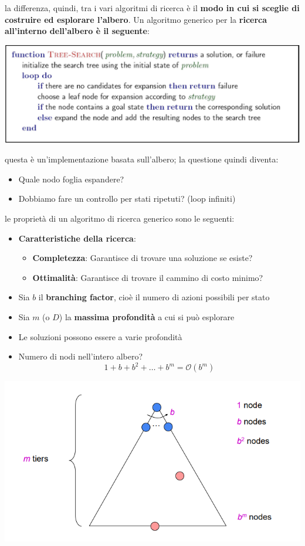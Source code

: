 \documentclass[12pt]{article}
\begin{document}
la differenza, quindi, tra i vari algoritmi di ricerca è il \textbf{modo in cui si sceglie di costruire ed esplorare l'albero}.
Un algoritmo generico per la \textbf{ricerca all'interno dell'albero è il seguente}:
\begin{center}
    \includegraphics[width = 1\linewidth]{Images/25.PNG}
\end{center}
questa è un'implementazione basata sull'albero; la questione quindi diventa:
\begin{itemize}
    \item Quale nodo foglia espandere?
    \item Dobbiamo fare un controllo per stati ripetuti? (loop infiniti)
\end{itemize}
le proprietà di un algoritmo di ricerca generico sono le seguenti:
\begin{itemize}
    \item \textbf{Caratteristiche della ricerca}:
    \begin{itemize}
        \item \textbf{Completezza}: Garantisce di trovare una soluzione se esiste?
        \item \textbf{Ottimalità}: Garantisce di trovare il cammino di costo minimo?
    \end{itemize}
    \item Sia $b$ il \textbf{branching factor}, cioè il numero di azioni possibili per stato
    \item Sia $m$ (o $D$) la \textbf{massima profondità} a cui si può esplorare
    \item Le soluzioni possono essere a varie profondità
    \item Numero di nodi nell'intero albero? $$1 + b + b^2 + \dots + b^m = \mathcal{O}(b^m)$$
\end{itemize}
\begin{center}
    \includegraphics[width = 0.80\linewidth]{Images/29.PNG}
\end{center}
\end{document}
